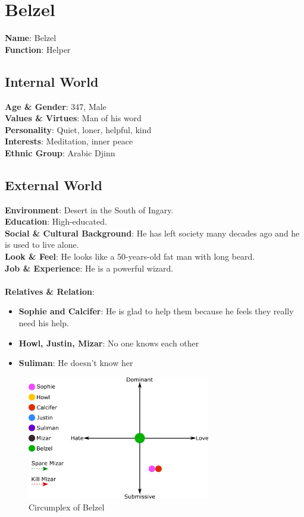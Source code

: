 \section{Belzel}

\textbf{Name}: Belzel \\
\textbf{Function}: Helper

\subsection{Internal World}

\textbf{Age \& Gender}: 347, Male \\
\textbf{Values \& Virtues}: Man of his word  \\
\textbf{Personality}: Quiet, loner, helpful, kind \\
\textbf{Interests}: Meditation, inner peace \\
\textbf{Ethnic Group}: Arabic Djinn

\subsection{External World}
\textbf{Environment}: Desert in the South of Ingary.  \\
\textbf{Education}: High-educated. \\
\textbf{Social \& Cultural Background}: He has left society many decades ago and he is used to live alone. \\
\textbf{Look \& Feel}: He looks like a 50-years-old fat man with long beard. \\
\textbf{Job \& Experience}: He is a powerful wizard. \\
\\
\textbf{Relatives \& Relation}:
\begin{itemize}
\item \textbf{Sophie and Calcifer}: He  is glad to help them because he feels they really need his help.
\item \textbf{Howl, Justin, Mizar}: No one knows each other
\item \textbf{Suliman}: He doesn’t know her
\end{itemize}

\begin{figure}[H]
  \centering
  \includegraphics[width=8cm]{Images/Circumplexes/belzelCircumplex}
  \caption{Circumplex of Belzel}
\end{figure}

